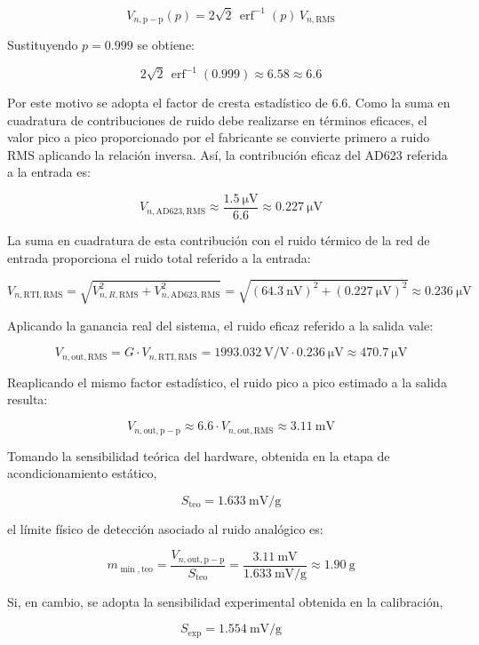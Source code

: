 \[
    V_{n,\mathrm{p-p}}(p) = 2\sqrt{2}\,\operatorname{erf}^{-1}(p)\,V_{n,\mathrm{RMS}}
\]

Sustituyendo $p=0.999$ se obtiene:

\[
    2\sqrt{2}\,\operatorname{erf}^{-1}(0.999) \approx 6.58 \approx 6.6
\]

Por este motivo se adopta el factor de cresta estadístico de 6.6. Como la suma en cuadratura de contribuciones de ruido debe realizarse en términos eficaces, el valor pico a pico proporcionado por el fabricante se convierte primero a ruido RMS aplicando la relación inversa. Así, la contribución eficaz del AD623 referida a la entrada es:

\[
    V_{n,\mathrm{AD623,RMS}} \approx \frac{\SI{1.5}{\micro\V}}{6.6}
    \approx \SI{0.227}{\micro\V}
\]

La suma en cuadratura de esta contribución con el ruido térmico de la red de entrada proporciona el ruido total referido a la entrada:

\[
    V_{n,\mathrm{RTI,RMS}} = \sqrt{V_{n,R,\mathrm{RMS}}^{2} + V_{n,\mathrm{AD623,RMS}}^{2}}
    = \sqrt{(\SI{64.3}{\nano\V})^{2} + (\SI{0.227}{\micro\V})^{2}}
    \approx \SI{0.236}{\micro\V}
\]

Aplicando la ganancia real del sistema, el ruido eficaz referido a la salida vale:

\[
    V_{n,\mathrm{out,RMS}} = G \cdot V_{n,\mathrm{RTI,RMS}}
    = \SI{1993.032}{\V\per\V} \cdot \SI{0.236}{\micro\V}
    \approx \SI{470.7}{\micro\V}
\]

Reaplicando el mismo factor estadístico, el ruido pico a pico estimado a la salida resulta:

\[
    V_{n,\mathrm{out,p-p}} \approx 6.6 \cdot V_{n,\mathrm{out,RMS}}
    \approx \SI{3.11}{\milli\V}
\]

Tomando la sensibilidad teórica del hardware, obtenida en la etapa de acondicionamiento estático,

\[
    S_{\mathrm{teo}} = \SI{1.633}{\milli\V\per\g}
\]

el límite físico de detección asociado al ruido analógico es:

\[
    m_{\min,\mathrm{teo}} = \frac{V_{n,\mathrm{out,p-p}}}{S_{\mathrm{teo}}}
    = \frac{\SI{3.11}{\milli\V}}{\SI{1.633}{\milli\V\per\g}}
    \approx \SI{1.90}{\g}
\]

Si, en cambio, se adopta la sensibilidad experimental obtenida en la calibración,

\[
    S_{\mathrm{exp}} = \SI{1.554}{\milli\V\per\g}
\]

